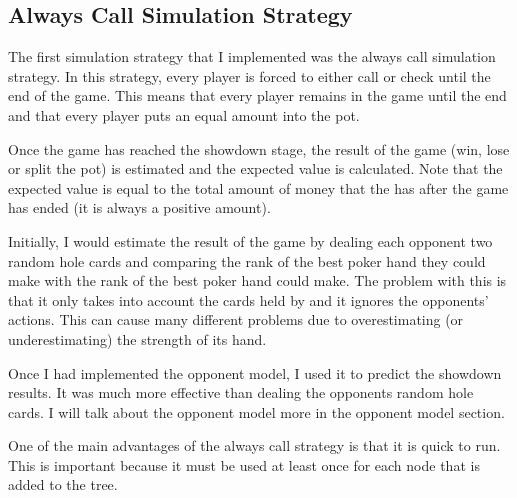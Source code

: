 \subsection{Always Call Simulation Strategy}		%

The first simulation strategy that I implemented was the always call simulation strategy. In this strategy, every player is forced to either call or check until the end of the game. This means that every player remains in the game until the end and that every player puts an equal amount into the pot.

Once the game has reached the showdown stage, the result of the game (win, lose or split the pot) is estimated and the expected value is calculated. Note that the expected value is equal to the total amount of money that the \mbt has after the game has ended (it is always a positive amount). 


Initially, I would estimate the result of the game by dealing each opponent two random hole cards and comparing the rank of the best poker hand they could make with the rank of the best poker hand \mbt could make. The problem with this is that it only takes into account the cards held by \mbt and it ignores the opponents' actions. This can cause many different problems due to \mbt overestimating (or underestimating) the strength of its hand.

Once I had implemented the opponent model, I used it to predict the showdown results. It was much more effective than dealing the opponents random hole cards. I will talk about the opponent model more in the opponent model section.

One of the main advantages of the always call strategy is that it is quick to run. This is important because it must be used at least once for each node that is added to the tree.


